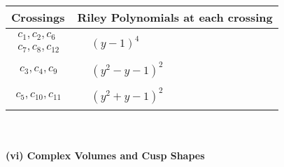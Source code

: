 \documentclass[1p]{elsarticle_modified}
\theoremstyle{definition}
\begin{document}
\begin{tabular}{m{50pt}|m{274pt}}
Crossings & \hspace{64pt}Riley Polynomials at each crossing \\
\hline $$\begin{aligned}c_{1},c_{2},c_{6}\\c_{7},c_{8},c_{12}\end{aligned}$$&$\begin{aligned}
&(y-1)^4
\end{aligned}$\\
\hline $$\begin{aligned}c_{3},c_{4},c_{9}\end{aligned}$$&$\begin{aligned}
&(y^2- y-1)^2
\end{aligned}$\\
\hline $$\begin{aligned}c_{5},c_{10},c_{11}\end{aligned}$$&$\begin{aligned}
&(y^2+y-1)^2
\end{aligned}$\\
\hline
\end{tabular}\\~\\
\newpage\flushleft \textbf{(vi) Complex Volumes and Cusp Shapes}
\end{document}
